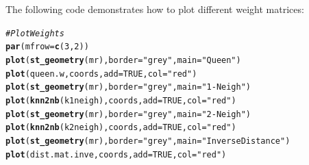 \documentclass[english,12pt]{book}\usepackage[]{graphicx}\usepackage[]{xcolor}
\makeatletter
\newcommand{\hlnum}[1]{\textcolor[rgb]{0.686,0.059,0.569}{#1}}%
\newcommand{\hlstr}[1]{\textcolor[rgb]{0.192,0.494,0.8}{#1}}%
\newcommand{\hlcom}[1]{\textcolor[rgb]{0.678,0.584,0.686}{\textit{#1}}}%
\newcommand{\hlstd}[1]{\textcolor[rgb]{0.345,0.345,0.345}{#1}}%
\newcommand{\hlkwc}[1]{\textcolor[rgb]{0.333,0.667,0.333}{#1}}%
\newcommand{\hlkwd}[1]{\textcolor[rgb]{0.737,0.353,0.396}{\textbf{#1}}}%
\newenvironment{kframe}{%
 \def\at@end@of@kframe{}%
 \ifinner\ifhmode%
  \def\at@end@of@kframe{\end{minipage}}%
  \begin{minipage}{\columnwidth}%
 \fi\fi%
 \def\FrameCommand##1{\hskip\@totalleftmargin \hskip-\fboxsep
 \colorbox{shadecolor}{##1}\hskip-\fboxsep
     \hskip-\linewidth \hskip-\@totalleftmargin \hskip\columnwidth}%
 \MakeFramed {\advance\hsize-\width
   \@totalleftmargin\z@ \linewidth\hsize
   \@setminipage}}%
 {\par\unskip\endMakeFramed%
 \at@end@of@kframe}
\newenvironment{knitrout}{}{} %
\makeatother
\begin{document}
The following code demonstrates how to plot different weight matrices:

\begin{knitrout}
\color{fgcolor}\begin{kframe}
\begin{alltt}
\hlcom{# Plot Weights}
\hlkwd{par}\hlstd{(}\hlkwc{mfrow} \hlstd{=} \hlkwd{c}\hlstd{(}\hlnum{3}\hlstd{,} \hlnum{2}\hlstd{))}
\hlkwd{plot}\hlstd{(}\hlkwd{st_geometry}\hlstd{(mr),} \hlkwc{border} \hlstd{=} \hlstr{"grey"}\hlstd{,} \hlkwc{main} \hlstd{=} \hlstr{"Queen"}\hlstd{)}
\hlkwd{plot}\hlstd{(queen.w, coords,} \hlkwc{add} \hlstd{=}  \hlnum{TRUE}\hlstd{,} \hlkwc{col} \hlstd{=} \hlstr{"red"}\hlstd{)}
\hlkwd{plot}\hlstd{(}\hlkwd{st_geometry}\hlstd{(mr),} \hlkwc{border} \hlstd{=} \hlstr{"grey"}\hlstd{,} \hlkwc{main} \hlstd{=} \hlstr{"1-Neigh"}\hlstd{)}
\hlkwd{plot}\hlstd{(}\hlkwd{knn2nb}\hlstd{(k1neigh), coords,} \hlkwc{add} \hlstd{=} \hlnum{TRUE}\hlstd{,} \hlkwc{col} \hlstd{=} \hlstr{"red"}\hlstd{)}
\hlkwd{plot}\hlstd{(}\hlkwd{st_geometry}\hlstd{(mr),} \hlkwc{border} \hlstd{=} \hlstr{"grey"}\hlstd{,} \hlkwc{main} \hlstd{=} \hlstr{"2-Neigh"}\hlstd{)}
\hlkwd{plot}\hlstd{(}\hlkwd{knn2nb}\hlstd{(k2neigh), coords,} \hlkwc{add} \hlstd{=} \hlnum{TRUE}\hlstd{,} \hlkwc{col} \hlstd{=} \hlstr{"red"}\hlstd{)}
\hlkwd{plot}\hlstd{(}\hlkwd{st_geometry}\hlstd{(mr),} \hlkwc{border} \hlstd{=} \hlstr{"grey"}\hlstd{,} \hlkwc{main} \hlstd{=} \hlstr{"Inverse Distance"}\hlstd{)}
\hlkwd{plot}\hlstd{(dist.mat.inve, coords,} \hlkwc{add} \hlstd{=}  \hlnum{TRUE}\hlstd{,} \hlkwc{col} \hlstd{=} \hlstr{"red"}\hlstd{)}
\end{alltt}
\end{kframe}
\end{knitrout}
\end{document}
